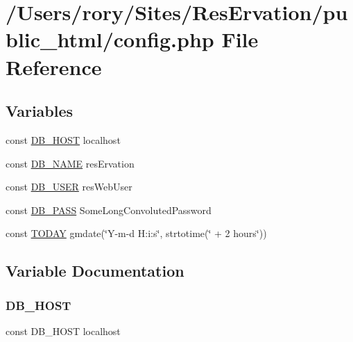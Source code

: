 \hypertarget{config_8php}{}\section{/\+Users/rory/\+Sites/\+Res\+Ervation/public\+\_\+html/config.php File Reference}
\label{config_8php}
\subsection*{Variables}
\begin{DoxyCompactItemize}
\item 
const \hyperlink{config_8php_a293363d7988627f671958e2d908c202a}{D\+B\+\_\+\+H\+O\+ST} \textquotesingle{}localhost\textquotesingle{}
\item 
const \hyperlink{config_8php_ab5db0d3504f917f268614c50b02c53e2}{D\+B\+\_\+\+N\+A\+ME} \textquotesingle{}res\+Ervation\textquotesingle{}
\item 
const \hyperlink{config_8php_a1d1d99f8e08f387d84fe9848f3357156}{D\+B\+\_\+\+U\+S\+ER} \textquotesingle{}res\+Web\+User\textquotesingle{}
\item 
const \hyperlink{config_8php_a8bb9c4546d91667cfa61879d83127a92}{D\+B\+\_\+\+P\+A\+SS} \textquotesingle{}Some\+Long\+Convoluted\+Password\textquotesingle{}
\item 
const \hyperlink{config_8php_a2e7ab70d786ad1c2e3c1f87f15b3df27}{T\+O\+D\+AY} gmdate(\char`\"{}Y-\/m-\/d H\+:i\+:s\char`\"{}, strtotime(\char`\"{} + 2 hours\char`\"{}))
\end{DoxyCompactItemize}


\subsection{Variable Documentation}
\mbox{\label{config_8php_a293363d7988627f671958e2d908c202a}} 
\subsubsection{\texorpdfstring{D\+B\+\_\+\+H\+O\+ST}{DB\_HOST}}
{\footnotesize\ttfamily const D\+B\+\_\+\+H\+O\+ST \textquotesingle{}localhost\textquotesingle{}}



